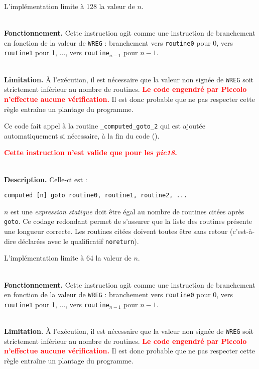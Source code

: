 L'implémentation limite à 128 la valeur de $n$.

~\\
\textbf{Fonctionnement.} Cette instruction agit comme une instruction de branchement en fonction de la valeur de \texttt{WREG} : branchement vers \texttt{routine0} pour 0, vers \texttt{routine1} pour 1, ..., vers \texttt{routine$_{n-1}$} pour $n-1$. 

~\\
\textbf{Limitation.} À l'exécution, il est nécessaire que la valeur non signée de \texttt{WREG} soit strictement inférieur au nombre de routines. \textcolor{red}{\bf Le code engendré par Piccolo n'effectue aucune vérification.} Il est donc probable que ne pas respecter cette règle entraîne un plantage du programme.

Ce code fait appel à la routine \texttt{\_computed\_goto\_2} qui est ajoutée automatiquement si nécessaire, à la fin du code (). 




\textcolor{red}{\bf Cette instruction n'est valide que pour les \emph{pic18}.}

~\\
\textbf{Description.} Celle-ci est :
\begin{lstlisting}[language=piccolo]
computed [n] goto routine0, routine1, routine2, ...
\end{lstlisting}

$n$ est une \emph{expression statique} doit être égal au nombre de routines citées après \texttt{goto}. Ce codage redondant permet de s'assurer que la liste des routines présente une longueur correcte. Les routines citées doivent toutes être sans retour (c'est-à-dire déclarées avec le qualificatif \texttt{noreturn}).

L'implémentation limite à 64 la valeur de $n$.

~\\
\textbf{Fonctionnement.} Cette instruction agit comme une instruction de branchement en fonction de la valeur de \texttt{WREG} : branchement vers \texttt{routine0} pour 0, vers \texttt{routine1} pour 1, ..., vers \texttt{routine$_{n-1}$} pour $n-1$. 

~\\
\textbf{Limitation.} À l'exécution, il est nécessaire que la valeur non signée de \texttt{WREG} soit strictement inférieur au nombre de routines. \textcolor{red}{\bf Le code engendré par Piccolo n'effectue aucune vérification.} Il est donc probable que ne pas respecter cette règle entraîne un plantage du programme.


